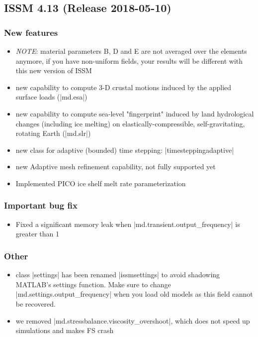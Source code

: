 \subsection*{ISSM 4.13 (Release 2018-05-10)}
\subsubsection{New features}
\begin{itemize}
\item \emph{NOTE}: material parameters B, D and E are not averaged over the elements anymore, if you have non-uniform fields, your results will be different with this new version of ISSM
\item new capability to compute 3-D crustal motions induced by the applied surface loads (\lstinlinebg|md.esa|)
\item new capability to compute sea-level "fingerprint" induced by land hydrological changes (including ice melting) on elastically-compressible, self-gravitating, rotating Earth (\lstinlinebg|md.slr|)
\item new class for adaptive (bounded) time stepping: \lstinlinebg|timesteppingadaptive|
\item new Adaptive mesh refinement capability, not fully supported yet
\item Implemented PICO ice shelf melt rate parameterization
\end{itemize}
\subsubsection{Important bug fix}
\begin{itemize}
\item Fixed a significant memory leak when \lstinlinebg|md.transient.output_frequency| is greater than 1
\end{itemize}
\subsubsection{Other}
\begin{itemize}
\item class \lstinlinebg|settings| has been renamed \lstinlinebg|issmsettings| to avoid shadowing MATLAB's settings function. Make sure to change \lstinlinebg|md.settings.output_frequency| when you load old models as this field cannot be recovered.
\item we removed \lstinlinebg|md.stressbalance.viscosity_overshoot|, which does not speed up simulations and makes FS crash
\end{itemize}

